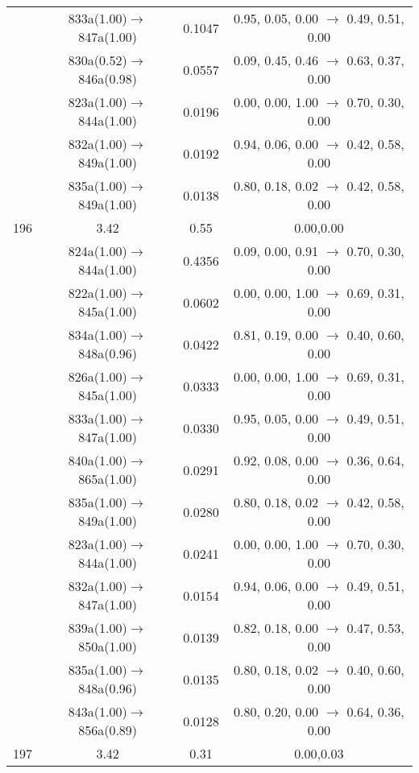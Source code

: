 \documentclass[10pt,a4paper]{article}
\begin{document}
\begin{longtable}{c|c|c|c}
 	& 833a(1.00)$\rightarrow$847a(1.00) &	 0.1047 &	 0.95, 0.05, 0.00 $\rightarrow$ 0.49, 0.51, 0.00 \\ 
 	& 830a(0.52)$\rightarrow$846a(0.98) &	 0.0557 &	 0.09, 0.45, 0.46 $\rightarrow$ 0.63, 0.37, 0.00 \\ 
 	& 823a(1.00)$\rightarrow$844a(1.00) &	 0.0196 &	 0.00, 0.00, 1.00 $\rightarrow$ 0.70, 0.30, 0.00 \\ 
 	& 832a(1.00)$\rightarrow$849a(1.00) &	 0.0192 &	 0.94, 0.06, 0.00 $\rightarrow$ 0.42, 0.58, 0.00 \\ 
 	& 835a(1.00)$\rightarrow$849a(1.00) &	 0.0138 &	 0.80, 0.18, 0.02 $\rightarrow$ 0.42, 0.58, 0.00 \\ 
 \hline196 &	 3.42 &	 0.55 &	 0.00,0.00 \\ 
  	& 824a(1.00)$\rightarrow$844a(1.00) &	 0.4356 &	 0.09, 0.00, 0.91 $\rightarrow$ 0.70, 0.30, 0.00 \\ 
 	& 822a(1.00)$\rightarrow$845a(1.00) &	 0.0602 &	 0.00, 0.00, 1.00 $\rightarrow$ 0.69, 0.31, 0.00 \\ 
 	& 834a(1.00)$\rightarrow$848a(0.96) &	 0.0422 &	 0.81, 0.19, 0.00 $\rightarrow$ 0.40, 0.60, 0.00 \\ 
 	& 826a(1.00)$\rightarrow$845a(1.00) &	 0.0333 &	 0.00, 0.00, 1.00 $\rightarrow$ 0.69, 0.31, 0.00 \\ 
 	& 833a(1.00)$\rightarrow$847a(1.00) &	 0.0330 &	 0.95, 0.05, 0.00 $\rightarrow$ 0.49, 0.51, 0.00 \\ 
 	& 840a(1.00)$\rightarrow$865a(1.00) &	 0.0291 &	 0.92, 0.08, 0.00 $\rightarrow$ 0.36, 0.64, 0.00 \\ 
 	& 835a(1.00)$\rightarrow$849a(1.00) &	 0.0280 &	 0.80, 0.18, 0.02 $\rightarrow$ 0.42, 0.58, 0.00 \\ 
 	& 823a(1.00)$\rightarrow$844a(1.00) &	 0.0241 &	 0.00, 0.00, 1.00 $\rightarrow$ 0.70, 0.30, 0.00 \\ 
 	& 832a(1.00)$\rightarrow$847a(1.00) &	 0.0154 &	 0.94, 0.06, 0.00 $\rightarrow$ 0.49, 0.51, 0.00 \\ 
 	& 839a(1.00)$\rightarrow$850a(1.00) &	 0.0139 &	 0.82, 0.18, 0.00 $\rightarrow$ 0.47, 0.53, 0.00 \\ 
 	& 835a(1.00)$\rightarrow$848a(0.96) &	 0.0135 &	 0.80, 0.18, 0.02 $\rightarrow$ 0.40, 0.60, 0.00 \\ 
 	& 843a(1.00)$\rightarrow$856a(0.89) &	 0.0128 &	 0.80, 0.20, 0.00 $\rightarrow$ 0.64, 0.36, 0.00 \\ 
 \hline197 &	 3.42 &	 0.31 &	 0.00,0.03 \\ 

\end{longtable}
\end{document}
